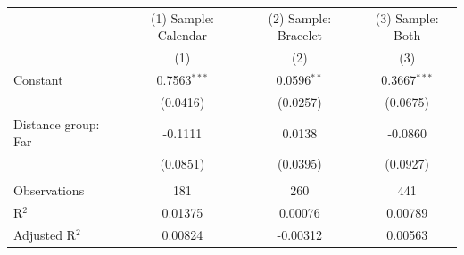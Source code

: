 
\begingroup
\centering
\begin{tabular}{lccc}
   \toprule
                       & (1) Sample: Calendar & (2) Sample: Bracelet & (3) Sample: Both \\   
                       & (1)                  & (2)                  & (3)\\  
   \midrule 
   Constant            & 0.7563$^{***}$       & 0.0596$^{**}$        & 0.3667$^{***}$\\   
                       & (0.0416)             & (0.0257)             & (0.0675)\\   
   Distance group: Far & -0.1111              & 0.0138               & -0.0860\\   
                       & (0.0851)             & (0.0395)             & (0.0927)\\   
    \\
   Observations        & 181                  & 260                  & 441\\  
   R$^2$               & 0.01375              & 0.00076              & 0.00789\\  
   Adjusted R$^2$      & 0.00824              & -0.00312             & 0.00563\\  
   \bottomrule
\end{tabular}
\par\endgroup


